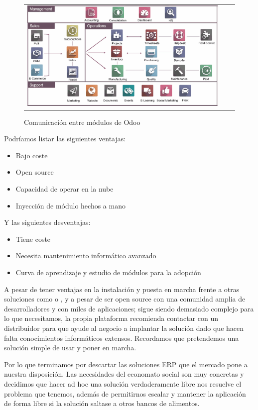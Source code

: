 \clearpage
\begin{figure}[h]
\centering
\begin{tabular}{ccc}
\includegraphics[scale=0.38]{archivos/odooModules2.png}
\end{tabular}
\caption{Comunicación entre módulos de Odoo}
\label{fig:odooModules}
\end{figure}
\par Podríamos listar las siguientes ventajas:
\begin{itemize}
    \item Bajo coste
    \item Open source
    \item Capacidad de operar en la nube
    \item Inyección de módulo hechos a mano
\end{itemize}
Y las siguientes desventajas:
\begin{itemize}
    \item Tiene coste
    \item Necesita mantenimiento informático avanzado
    \item Curva de aprendizaje y estudio de módulos para la adopción
\end{itemize}
\vspace{0.5em}
\par A pesar de tener ventajas en la instalación y puesta en marcha frente a otras soluciones como \citep{oracleERP} o \citep{sapERP}, y a pesar de ser open source con una comunidad amplia de desarrolladores y con miles de aplicaciones; sigue siendo demasiado complejo para lo que necesitamos, la propia plataforma recomienda contactar con un distribuidor para que ayude al negocio a implantar la solución dado que hacen falta conocimientos informáticos extensos. Recordamos que pretendemos una solución simple de usar y poner en marcha.
\vspace{0.5em}
\par Por lo que terminamos por descartar las soluciones ERP que el mercado pone a nuestra disposición. Las necesidades del economato social son muy concretas y decidimos que hacer ad hoc una solución verdaderamente libre nos resuelve el problema que tenemos, además de permitirnos escalar y mantener la aplicación de forma libre si la solución saltase a otros bancos de alimentos.
\clearpage
